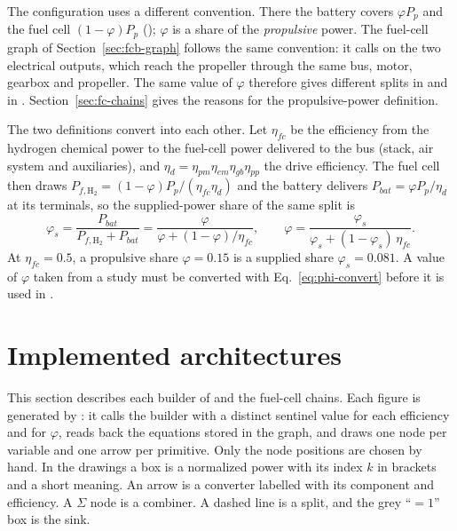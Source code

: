 \documentclass[a4paper,11pt]{article}
\begin{document}
The  configuration uses a different convention. There the battery
covers $\varphi P_p$ and the fuel cell $(1 - \varphi)P_p$
(); $\varphi$ is a share of the \emph{propulsive}
power. The fuel-cell graph of Section~\ref{sec:fcb-graph} follows the same convention: it
calls  on the two electrical outputs, which reach the
propeller through the same bus, motor, gearbox and propeller. The same value of $\varphi$
therefore gives different splits in  and in .
Section~\ref{sec:fc-chains} gives the reasons for the propulsive-power definition.

The two definitions convert into each other. Let $\eta_{fc}$ be the efficiency from the
hydrogen chemical power to the fuel-cell power delivered to the bus (stack, air system and
auxiliaries), and $\eta_d = \eta_{pm}\eta_{em}\eta_{gb}\eta_{pp}$ the drive efficiency. The
fuel cell then draws $P_{f,\mathrm{H_2}} = (1-\varphi)P_p/(\eta_{fc}\eta_d)$ and the battery
delivers $P_{bat} = \varphi P_p/\eta_d$ at its terminals, so the supplied-power share of the
same split is
\begin{equation}
  \varphi_s = \frac{P_{bat}}{P_{f,\mathrm{H_2}} + P_{bat}}
            = \frac{\varphi}{\varphi + (1-\varphi)/\eta_{fc}} ,\qquad
  \varphi = \frac{\varphi_s}{\varphi_s + (1-\varphi_s)\,\eta_{fc}} .
  \label{eq:phi-convert}
\end{equation}
At $\eta_{fc} = 0.5$, a propulsive share $\varphi = 0.15$ is a supplied share
$\varphi_s = 0.081$. A value of $\varphi$ taken from a  study must be
converted with Eq.~\eqref{eq:phi-convert} before it is used in .

\section{Implemented architectures}\label{sec:architectures}

This section describes each builder of  and the fuel-cell chains. Each
figure is generated by : it calls the builder with a distinct
sentinel value for each efficiency and for $\varphi$, reads back the equations stored in the
graph, and draws one node per variable and one arrow per primitive. Only the node positions
are chosen by hand. In the drawings a box is a normalized power with its index $k$ in
brackets and a short meaning. An arrow is a converter labelled with its component and
efficiency. A $\Sigma$ node is a combiner. A dashed line is a split, and the grey ``$=1$''
box is the sink.
\end{document}
